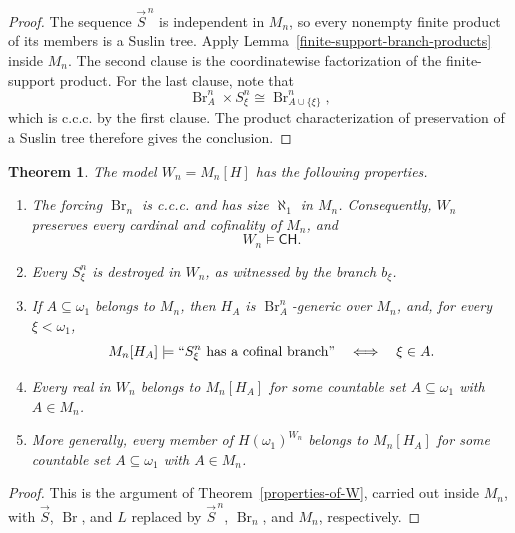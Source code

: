 \documentclass[a4paper,11pt]{article}
\newtheorem{theorem}{Theorem}[section]
\newcommand{\CH}{\mathsf{CH}}
\begin{document}
\begin{proof}
The sequence $\vec S^{\,n}$ is independent in $M_n$, so every nonempty
finite product of its members is a Suslin tree.  Apply
Lemma~\ref{finite-support-branch-products} inside $M_n$.  The second clause is
the coordinatewise factorization of the finite-support product.  For the last
clause, note that
\[
   \operatorname{Br}^n_A\times S^n_\xi
   \cong
   \operatorname{Br}^n_{A\cup\{\xi\}},
\]
which is c.c.c. by the first clause.  The product characterization of
preservation of a Suslin tree therefore gives the conclusion.
\end{proof}

\begin{theorem}
\label{theorem-properties-of-Wn}
The model $W_n=M_n[H]$ has the following properties.
\begin{enumerate}
   \item The forcing $\operatorname{Br}_n$ is c.c.c. and has size
         $\aleph_1$ in $M_n$.  Consequently, $W_n$ preserves every cardinal
         and cofinality of $M_n$, and
         \[
            W_n\models\CH.
         \]

   \item Every $S^n_\xi$ is destroyed in $W_n$, as witnessed by the branch
         $b_\xi$.

   \item If $A\subseteq\omega_1$ belongs to $M_n$, then $H_A$ is
         $\operatorname{Br}^n_A$-generic over $M_n$, and, for every
         $\xi<\omega_1$,
         \[
            M_n[H_A]\models
            ``S^n_\xi\text{ has a cofinal branch}"
            \quad\Longleftrightarrow\quad
            \xi\in A.
         \]

   \item Every real in $W_n$ belongs to $M_n[H_A]$ for some countable set
         $A\subseteq\omega_1$ with $A\in M_n$.

   \item More generally, every member of $H(\omega_1)^{W_n}$ belongs to
         $M_n[H_A]$ for some countable set
         $A\subseteq\omega_1$ with $A\in M_n$.
\end{enumerate}
\end{theorem}

\begin{proof}
This is the argument of Theorem~\ref{properties-of-W}, carried out inside
$M_n$, with $\vec S$, $\operatorname{Br}$, and $L$ replaced by
$\vec S^{\,n}$, $\operatorname{Br}_n$, and $M_n$, respectively.  
\end{proof}
\end{document}
